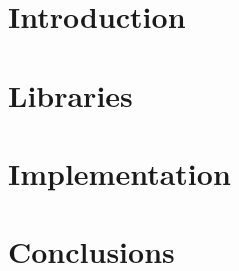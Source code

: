 \section[Intro]{Introduction}


\section[Libs]{Libraries}



\section[Impl]{Implementation}





\section[Con]{Conclusions}
